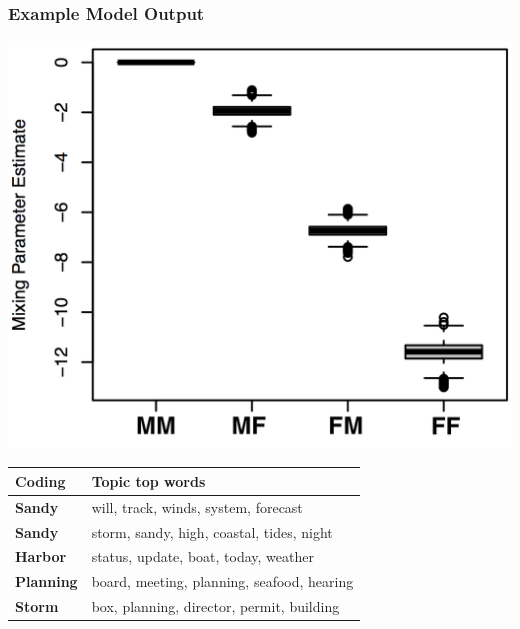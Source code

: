 \documentclass[xcolor={table}]{beamer}
\begin{document}
\begin{frame}\frametitle{Example Model Output}
	
	\centering
	\includegraphics[width = .56\textwidth]{./images/Dare_3_MP.png}\\
	\begin{tabular}{l l}
	\toprule
	Coding & Topic top words\\
	\midrule
	\textbf{Sandy} & will, track, winds, system, forecast\\ 
	\textbf{Sandy} & storm, sandy, high, coastal, tides, night\\ 
	\textbf{Harbor} & status, update, boat, today, weather\\ 
	\textbf{Planning} & board, meeting, planning, seafood, hearing\\ 
	\textbf{Storm} & box, planning, director,  permit, building \\ 
	\bottomrule

	\end{tabular}
	
\end{frame}
\end{document}
